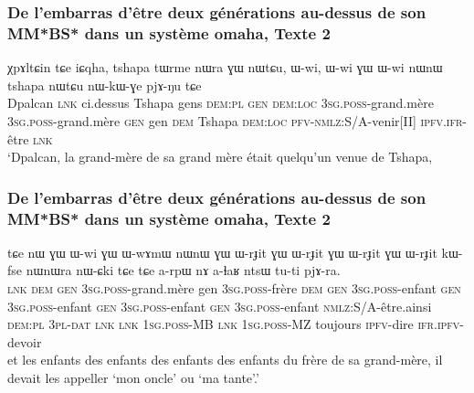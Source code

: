 \documentclass[xcolor=table]{beamer}
\newcommand{\ipa}[1]{{\phon #1}} %
\begin{document}
  \begin{frame} 
 \frametitle{De l'embarras d'être deux générations au-dessus de son MM*BS* dans un système omaha, Texte 2} 
 \begin{exe}
\ex 
\gll 
\ipa{χpɤltɕin} 	\ipa{tɕe} 	\ipa{iɕqha,} 	\ipa{tshapa} 	\ipa{tɯrme} 	\ipa{nɯra} 	\ipa{ɣɯ} 	\ipa{nɯtɕu,} \ipa{ɯ-wi,} 	\ipa{ɯ-wi} 	\ipa{ɣɯ} 	\ipa{ɯ-wi} 	\ipa{nɯnɯ} 	\ipa{tshapa} 	\ipa{nɯtɕu} 	\ipa{nɯ-kɯ-ɣe} 	\ipa{pjɤ-ŋu} 	\ipa{tɕe}  \\
Dpalcan \textsc{lnk} ci.dessus Tshapa gens  \textsc{dem:pl} \textsc{gen}  \textsc{dem:loc} \textsc{3sg.poss}-grand.mère  \textsc{3sg.poss}-grand.mère  \textsc{gen} gen \textsc{dem} Tshapa \textsc{dem:loc} \textsc{pfv}-\textsc{nmlz}:S/A-venir[II] \textsc{ipfv.ifr}-être \textsc{lnk}  \\
\glt `Dpalcan, la grand-mère de sa grand mère était quelqu'un venue de Tshapa, 
\end{exe}
\end{frame}

  \begin{frame} 
 \frametitle{De l'embarras d'être deux générations au-dessus de son MM*BS* dans un système omaha, Texte 2} 
\begin{exe}
\ex 
\gll 
\ipa{tɕe} 	\ipa{nɯ} 	\ipa{ɣɯ} 	\ipa{ɯ-wi} 	\ipa{ɣɯ} 	\ipa{ɯ-wɤmɯ} 	\ipa{nɯnɯ} 	\ipa{ɣɯ} 	\ipa{ɯ-rɟit} 	\ipa{ɣɯ} 	\ipa{ɯ-rɟit} 	\ipa{ɣɯ} 	\ipa{ɯ-rɟit} 	\ipa{ɣɯ} 	\ipa{ɯ-rɟit} 	\ipa{kɯ-fse} 	\ipa{nɯnɯra} 	\ipa{nɯ-ɕki} 	\ipa{tɕe} 	\ipa{tɕe} 	\ipa{a-rpɯ} \ipa{nɤ} \ipa{a-ɬaʁ} 	\ipa{ntsɯ} 	\ipa{tu-ti} 	\ipa{pjɤ-ra.} \\
\textsc{lnk} \textsc{dem} \textsc{gen} \textsc{3sg.poss}-grand.mère gen \textsc{3sg.poss}-frère \textsc{dem} \textsc{gen} \textsc{3sg.poss}-enfant \textsc{gen} \textsc{3sg.poss}-enfant \textsc{gen} \textsc{3sg.poss}-enfant \textsc{gen} \textsc{3sg.poss}-enfant \textsc{nmlz}:S/A-être.ainsi \textsc{dem:pl} \textsc{3pl-dat} \textsc{lnk}  \textsc{lnk} \textsc{1sg.poss}-MB \textsc{lnk} \textsc{1sg.poss}-MZ toujours \textsc{ipfv}-dire \textsc{ifr.ipfv}-devoir \\
\glt et les enfants des enfants des enfants des enfants du frère de sa grand-mère, il devait les appeller `mon oncle' ou `ma tante'.'
\end{exe}
\end{frame}
\end{document}
